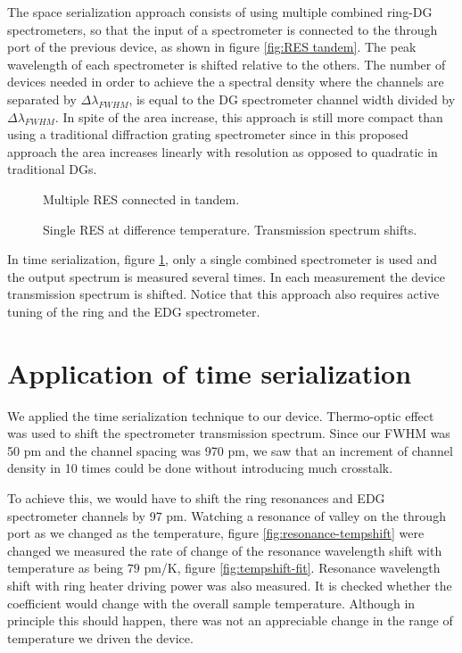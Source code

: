 \documentclass[12pt,twoside,english]{book}
\renewcommand{\~}{\perispomeni}%
\numberwithin{equation}{section}
\numberwithin{figure}{section}
\begin{document}
The space serialization approach consists of using multiple combined ring-DG spectrometers, so that the input of a spectrometer is connected to the through port of the previous device, as shown in figure \ref{fig:RES tandem}. The peak wavelength of each spectrometer is shifted relative to the others. The number of devices needed in order to achieve the a spectral density where the channels are separated by $\Delta\lambda_{FWHM}$, is equal to the DG spectrometer channel width divided by $\Delta\lambda_{FWHM}$. In spite of the area increase, this approach is still more compact than using a traditional diffraction grating spectrometer since in this proposed approach the area increases linearly with resolution as opposed to quadratic in traditional DGs.
\begin{figure}[h]
	\begin{minipage}[t]{0.49\columnwidth}%
		\caption{Multiple RES connected in tandem.\label{fig:RES tandem}}
	\end{minipage}\hfill{}%
	\begin{minipage}[t]{0.49\columnwidth}%
		\caption{Single RES at difference temperature. Transmission spectrum shifts.\label{fig:RES temperature}}
	\end{minipage}
\end{figure}

In time serialization, figure \ref{fig:RES temperature}, only a single combined spectrometer is used and the output spectrum is measured several times. In each measurement the device transmission spectrum is shifted. Notice that this approach also requires active tuning of the ring and the EDG spectrometer. 

\section{Application of time serialization}
We applied the time serialization technique to our device. Thermo-optic effect was used to shift the spectrometer transmission spectrum. Since our FWHM was 50 pm and the channel spacing was 970 pm, we saw that an increment of channel density in 10 times could be done without introducing much crosstalk.

To achieve this, we would have to shift the ring resonances and EDG spectrometer channels by 97 pm. Watching a resonance of valley on the through port as we changed as the temperature, figure \ref{fig:resonance-tempshift} were changed we measured the rate of change of the resonance wavelength shift with temperature as being $79$ pm/K, figure \ref{fig:tempshift-fit}.
Resonance wavelength shift with ring heater driving power was also measured. It is checked whether the coefficient would change with the overall sample temperature. Although in principle this should happen, there was not an appreciable change in the range of temperature we driven the device.
\end{document}

